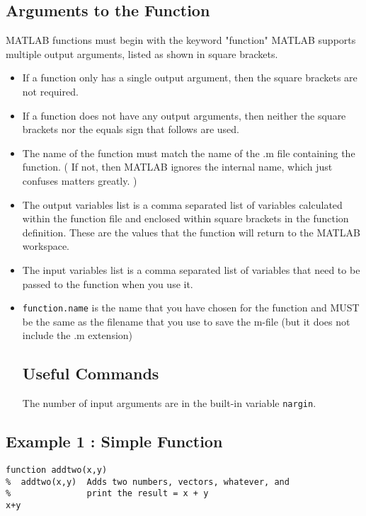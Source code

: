 \documentclass[a4paper,12pt]{article}
\begin{document}
\subsection{Arguments to the Function}
MATLAB functions must begin with the keyword "function"
MATLAB supports multiple output arguments, listed as shown in square brackets.
\begin{itemize}
\item If a function only has a single output argument, then the square brackets are not required.

\item  If a function does not have any output arguments, then neither the square brackets nor the equals sign that follows are used.

\item  The name of the function must match the name of the .m file containing the function. ( If not, then MATLAB ignores the internal name, which just confuses matters greatly. )

\item The output variables list is a comma separated list of variables calculated within the function file and enclosed within square brackets in the function definition. These are the values that the function will return to the MATLAB workspace.

\item  The input variables list is a comma separated list of variables that need to be passed to the function when you use it. 

\item \texttt{function.name} is the name that you have chosen for the function and MUST be the same as the filename that you use to save the m-file (but it does not include the .m extension)

\subsection{Useful Commands}

The number of input arguments are in the built-in variable \texttt{nargin}.

\end{itemize}

\newpage
\subsection{Example 1 : Simple Function}
\begin{framed}
\begin{verbatim}
function addtwo(x,y)
%  addtwo(x,y)  Adds two numbers, vectors, whatever, and
%               print the result = x + y
x+y
\end{verbatim}
\end{framed}
\end{document}
